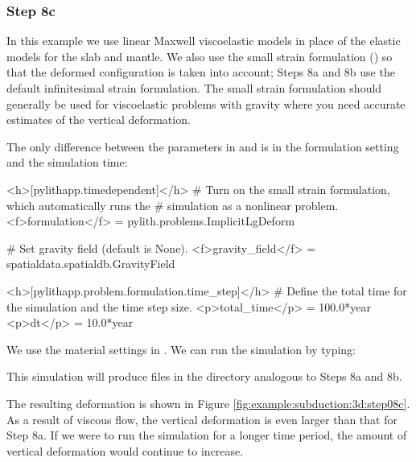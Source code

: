 \subsubsection{Step 8c}

In this example we use linear Maxwell viscoelastic models in place of
the elastic models for the slab and mantle. We also use the small
strain formulation () so that the deformed
configuration is taken into account; Steps 8a and 8b use the default
 infinitesimal strain formulation. The small strain
formulation should generally be used for viscoelastic problems with
gravity where you need accurate estimates of the vertical deformation.


The only difference between the parameters in 
and  is in the formulation setting and the
simulation time:
\begin{cfg}
<h>[pylithapp.timedependent]</h>
# Turn on the small strain formulation, which automatically runs the
# simulation as a nonlinear problem.
<f>formulation</f> = pylith.problems.ImplicitLgDeform

# Set gravity field (default is None).
<f>gravity_field</f> = spatialdata.spatialdb.GravityField

<h>[pylithapp.problem.formulation.time_step]</h>
# Define the total time for the simulation and the time step size.
<p>total_time</p> = 100.0*year
<p>dt</p> = 10.0*year
\end{cfg}
We use the material settings in . We
can run the simulation by typing:
This simulation will produce files in the  directory
analogous to Steps 8a and 8b.

The resulting deformation is shown in Figure
\ref{fig:example:subduction:3d:step08c}. As a result of viscous flow,
the vertical deformation is even larger than that for Step 8a. If we
were to run the simulation for a longer time period, the amount of
vertical deformation would continue to increase.

